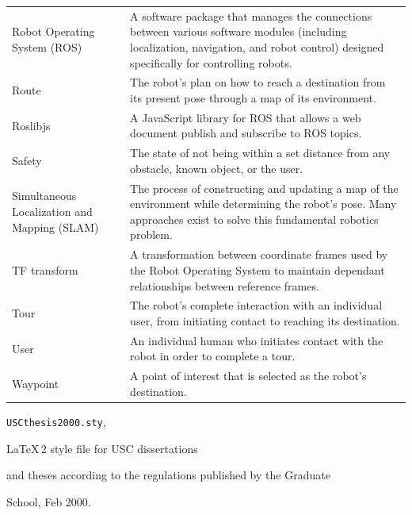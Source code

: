 \documentclass[11pt]{report}
\begin{document}
\begin{longtable}{p{3cm}p{9.9cm}}
Robot Operating System (ROS)&A software package that manages the connections between various software modules (including localization, navigation, and robot control) designed specifically for controlling robots.\\
Route&The robot’s plan on how to reach a destination from its present pose through a map of its environment.\\
Roslibjs&A JavaScript library for ROS that allows a web document publish and subscribe to ROS topics.\\
Safety&The state of not being within a set distance from any obstacle, known object, or the user.\\
Simultaneous Localization and Mapping (SLAM)&The process of constructing and updating a map of the environment while determining the robot’s pose. Many approaches exist to solve this fundamental robotics problem.\\
TF transform&A transformation between coordinate frames used by the Robot Operating System to maintain dependant relationships between reference frames.\\
Tour&The robot’s complete interaction with an individual user, from initiating contact to reaching its destination.\\
User&An individual human who initiates contact with the robot in order to complete a tour.\\
Waypoint&A point of interest that is selected as the robot’s destination.
\end{longtable}



\begin{thebibliography}{99}

  \verb=USCthesis2000.sty=,

 \LaTeX\,2\raisebox{-0.2ex}{$\varepsilon$} style file for USC dissertations

 and theses according to the regulations published by the Graduate

 School, Feb 2000.

\end{thebibliography}
\end{document}
